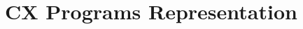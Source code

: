 \documentclass[11pt,fleqn,openany]{book} %
\begin{document}



\chapter{CX Programs Representation}
\label{chapter:cx-programs-representation}

\end{document}
